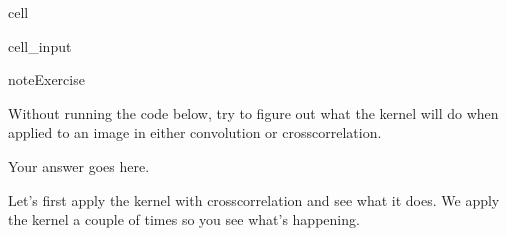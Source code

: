 \documentclass[letterpaper,10pt,english]{jupyterBook}
\begin{document}
\begin{sphinxuseclass}{cell}\begin{sphinxVerbatimInput}

\begin{sphinxuseclass}{cell_input}
\begin{sphinxVerbatim}[commandchars=\\\{\}]
  \PYG{p}{[}\PYG{p}{[}  \PYG{p}{]}
              \PYG{p}{[}  \PYG{p}{]}
              \PYG{p}{[}  \PYG{p}{]}\PYG{p}{]}
\end{sphinxVerbatim}

\end{sphinxuseclass}\end{sphinxVerbatimInput}

\end{sphinxuseclass}
\begin{sphinxadmonition}{note}{Exercise}

\sphinxAtStartPar
Without running the code below, try to figure out what the kernel will do when applied to an image in either convolution or cross\sphinxhyphen{}correlation.
\end{sphinxadmonition}

\sphinxAtStartPar
Your answer goes here.

\sphinxAtStartPar
Let’s first apply the kernel with cross\sphinxhyphen{}correlation  and see what it does. We apply the kernel a couple of times so you see what’s happening.
\end{document}
